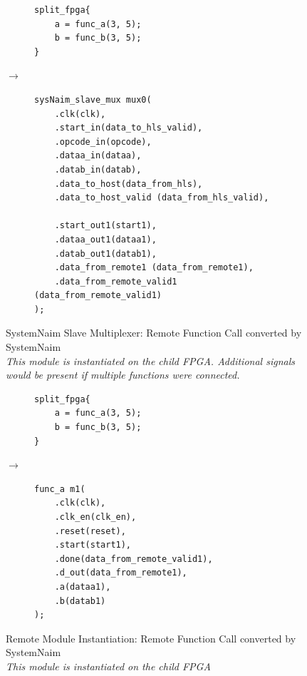 \begin{figure}[H]
\centering
\begin{subfigure}{0.32\textwidth}
    \centering
    \begin{verbatim}
split_fpga{
    a = func_a(3, 5);
    b = func_b(3, 5);
}
\end{verbatim}
\end{subfigure}%
{\LARGE$\rightarrow$}%
\begin{subfigure}{0.58\textwidth}
    \begin{verbatim}
sysNaim_slave_mux mux0(
    .clk(clk),
    .start_in(data_to_hls_valid),
    .opcode_in(opcode),
    .dataa_in(dataa),
    .datab_in(datab),
    .data_to_host(data_from_hls),
    .data_to_host_valid (data_from_hls_valid),

    .start_out1(start1),
    .dataa_out1(dataa1),
    .datab_out1(datab1),
    .data_from_remote1 (data_from_remote1),
    .data_from_remote_valid1 (data_from_remote_valid1)
);
    \end{verbatim}
\end{subfigure}
\caption{SystemNaim Slave Multiplexer: Remote Function Call converted by SystemNaim \\ \textit{This module is instantiated on the child FPGA. Additional signals would be present if multiple functions were connected.}}
\label{sn:rmt_func_call_slv_mux}
\end{figure}

\begin{figure}[H]
\centering
\begin{subfigure}{0.32\textwidth}
    \centering
    \begin{verbatim}
split_fpga{
    a = func_a(3, 5);
    b = func_b(3, 5);
}
\end{verbatim}
\end{subfigure}%
{\LARGE$\rightarrow$}%
\begin{subfigure}{0.58\textwidth}
    \begin{verbatim}
func_a m1(
    .clk(clk),
    .clk_en(clk_en),
    .reset(reset),
    .start(start1),
    .done(data_from_remote_valid1),
    .d_out(data_from_remote1),
    .a(dataa1),
    .b(datab1)
);
    \end{verbatim}
\end{subfigure}
\caption{Remote Module Instantiation: Remote Function Call converted by SystemNaim \\ \textit{This module is instantiated on the child FPGA}}
\label{sn:rmt_func_call_slv_mdl}
\end{figure}
        
